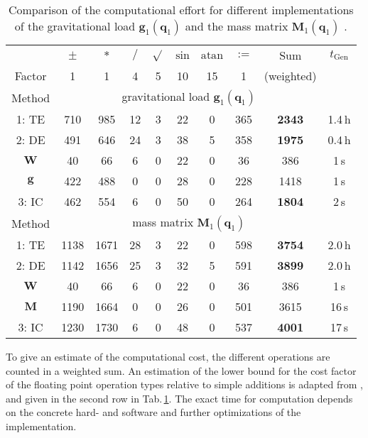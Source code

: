 \documentclass{svproc}
\newcommand{\bm}[1]{\boldsymbol{#1}}
\begin{document}
\begin{table}[tb]
    \caption{Comparison of the computational effort for different implementations of the gravitational load $\bm{g}_1(\bm{q}_1)$ and the mass matrix $\bm{M}_1(\bm{q}_1)$ .}
    \label{tab:computation}
    \centering
    \setlength\tabcolsep{3pt}
    \small
    \begin{tabular}[t]{|c|c|c|c|c|c|c|c|c|c|} 
        \hline
         & $\pm$ & $*$ & $/$ & $\sqrt{}$ & $\mathrm{sin}$ & $\mathrm{atan}$ & $:=$ & Sum & $t_{\mathrm{Gen}}$ \\
        Factor & 1 & 1 & 4 & 5 & 10 & 15 & 1 & (weighted) & \\
        \hline
        Method & \multicolumn{8}{c}{gravitational load $\bm{g}_1(\bm{q}_1)$} &  \\
        \hline
        \rowcolor{Gray}
        1: TE  & 710 & 985 & 12 & 3 & 22 & 0 & 365 & \textbf{2343} & 1.4\,h \\
        \rowcolor{Gray}
        2: DE & 491 & 646 & 24 & 3 & 38 & 5 & 358 & \textbf{1975} & 0.4\,h \\
        $\bm{W}$ & 40 & 66 & 6 & 0 & 22 & 0 & 36 & 386 & 1\,s \\
        $\bm{g}$ & 422 & 488 & 0 & 0 & 28 & 0 & 228 & 1418 & 1\,s \\
        \rowcolor{Gray}
        3: IC & 462 & 554 & 6 & 0 & 50 & 0 & 264 & \textbf{1804} & 2\,s \\
        \hline
        Method & \multicolumn{8}{c}{mass matrix $\bm{M}_1(\bm{q}_1)$} & \\
        \hline
        \rowcolor{Gray}
        1: TE  & 1138 & 1671 & 28 & 3 & 22 & 0 & 598 & \textbf{3754} & 2.0\,h \\
        \rowcolor{Gray}
        2: DE & 1142 & 1656 & 25 & 3 & 32 & 5 & 591 & \textbf{3899} & 2.0\,h \\
        $\bm{W}$ & 40 & 66 & 6 & 0 & 22 & 0 & 36 & 386 & 1\,s \\
        $\bm{M}$ & 1190 & 1664 & 0 & 0 & 26 & 0 & 501 & 3615 & 16\,s \\
        \rowcolor{Gray}
        3: IC & 1230 & 1730 & 6 & 0 & 48 & 0 & 537 & \textbf{4001} & 17\,s \\
        \hline
    \end{tabular}
    \vspace{-0.5cm}
\end{table}
%

To give an estimate of the computational cost, the different operations are counted in a weighted sum. An estimation of the lower bound for the cost factor of the floating point  operation types relative to simple additions is adapted from \cite{Atkinson2014}, \cite{Hindriksen2012} and given in the second row in Tab.\,\ref{tab:computation}.
The exact time for computation depends on the concrete hard- and software and further optimizations of the implementation.
\end{document}
